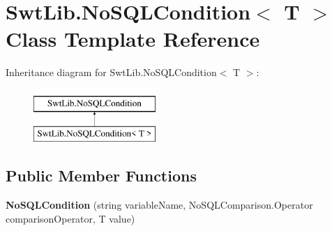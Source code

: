 \hypertarget{class_swt_lib_1_1_no_s_q_l_condition_3_01_t_01_4}{\section{Swt\-Lib.\-No\-S\-Q\-L\-Condition$<$ T $>$ Class Template Reference}
\label{class_swt_lib_1_1_no_s_q_l_condition_3_01_t_01_4}
}
Inheritance diagram for Swt\-Lib.\-No\-S\-Q\-L\-Condition$<$ T $>$\-:\begin{figure}[H]
\begin{center}
\leavevmode
\includegraphics[height=2.000000cm]{class_swt_lib_1_1_no_s_q_l_condition_3_01_t_01_4}
\end{center}
\end{figure}
\subsection*{Public Member Functions}
\begin{DoxyCompactItemize}
\item 
\hypertarget{class_swt_lib_1_1_no_s_q_l_condition_3_01_t_01_4_ab8d2f23ea2009864bb8a973f4d7d0503}{{\bfseries No\-S\-Q\-L\-Condition} (string variable\-Name, No\-S\-Q\-L\-Comparison.\-Operator comparison\-Operator, T value)}\label{class_swt_lib_1_1_no_s_q_l_condition_3_01_t_01_4_ab8d2f23ea2009864bb8a973f4d7d0503}

\end{DoxyCompactItemize}
